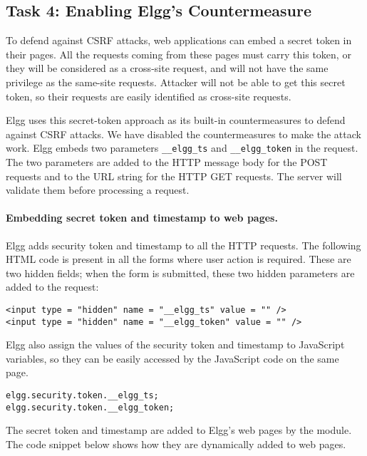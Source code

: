 \subsection{Task 4: Enabling Elgg's Countermeasure} 

To defend against CSRF attacks, web applications can embed a secret token
in their pages. All the requests coming from these pages must carry this 
token, or they will be considered as a cross-site request, and will
not have the same privilege as the same-site requests. 
Attacker will not be able to get this secret token, so their requests
are easily identified as cross-site requests. 


Elgg uses this secret-token approach as its 
built-in countermeasures to defend against CSRF attacks. 
We have disabled the countermeasures to make the attack work. 
Elgg embeds two parameters
{\tt\_\_elgg\_ts} and {\tt\_\_elgg\_token} in the request.
The two parameters are added to the HTTP message body for the POST requests and to the URL
string for the HTTP GET requests. The server will validate them
before processing a request. 


\paragraph{Embedding secret token and timestamp to web pages.}
Elgg adds security token and timestamp to all the HTTP requests. 
The following HTML code is present in all the forms where user action is required. 
These are two hidden fields; when the form is submitted, these
two hidden parameters are added to the request:

\begin{lstlisting}
<input type = "hidden" name = "__elgg_ts" value = "" />
<input type = "hidden" name = "__elgg_token" value = "" />
\end{lstlisting}

Elgg also assign the values of the security token and timestamp to JavaScript variables, 
so they can be easily accessed by the JavaScript code on the same page.

\begin{lstlisting}
elgg.security.token.__elgg_ts;
elgg.security.token.__elgg_token;
\end{lstlisting}


The secret token and timestamp are added to Elgg's web pages by the 
module. The code snippet below shows how they are dynamically 
added to web pages.


